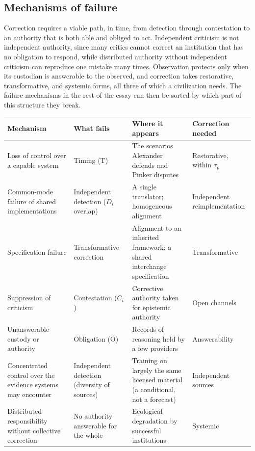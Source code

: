\documentclass[11pt]{article}
\begin{document}
\subsection{Mechanisms of failure}\label{sec:mech}

Correction requires a viable path, in time, from detection through contestation to an authority that is both able and obliged to act. Independent criticism is not independent authority, since many critics cannot correct an institution that has no obligation to respond, while distributed authority without independent criticism can reproduce one mistake many times. Observation protects only when its custodian is answerable to the observed, and correction takes restorative, transformative, and systemic forms, all three of which a civilization needs. The failure mechanisms in the rest of the essay can then be sorted by which part of this structure they break.

\begin{center}
\small
\begin{tabular}{@{}p{}p{}p{}p{}@{}}
\toprule
\textbf{Mechanism} & \textbf{What fails} & \textbf{Where it appears} & \textbf{Correction needed}\\
\midrule
Loss of control over a capable system & Timing (T) & The scenarios Alexander defends and Pinker disputes & Restorative, within $\tau_p$\\[0.5em]
Common-mode failure of shared implementations & Independent detection ($D_i$ overlap) & A single translator; homogeneous alignment & Independent reimplementation\\[0.5em]
Specification failure & Transformative correction & Alignment to an inherited framework; a shared interchange specification & Transformative\\[0.5em]
Suppression of criticism & Contestation ($C_i$) & Corrective authority taken for epistemic authority & Open channels\\[0.5em]
Unanswerable custody or authority & Obligation (O) & Records of reasoning held by a few providers & Answerability\\[0.5em]
Concentrated control over the evidence systems may encounter & Independent detection (diversity of sources) & Training on largely the same licensed material (a conditional, not a forecast) & Independent sources\\[0.5em]
Distributed responsibility without collective correction & No authority answerable for the whole & Ecological degradation by successful institutions & Systemic\\
\bottomrule
\end{tabular}
\end{center}
\end{document}
